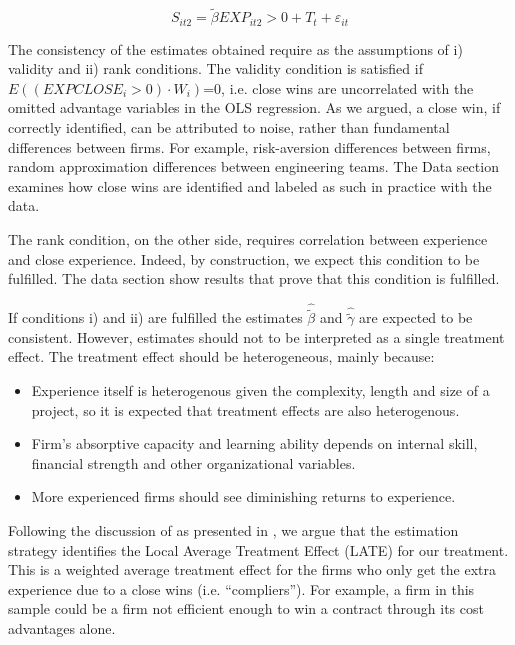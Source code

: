 \begin{equation}
\label{eqn:secondstage}
S_{it2}= \tilde{\beta} EXP_{it2}>0+T_t+\varepsilon_{it}
\end{equation}

The consistency of the estimates obtained require as the assumptions of i) validity and ii) rank conditions. The validity condition is satisfied if $E((EXPCLOSE_{i}>0)\cdot W_i)$=0, i.e. close wins are uncorrelated with the omitted advantage variables in the OLS regression. As we argued, a close win, if correctly identified, can be attributed to noise, rather than fundamental differences between firms. For example, risk-aversion differences between firms, random approximation differences between engineering teams. The Data section examines how close wins are identified and labeled as such in practice with the data.

The rank condition, on the other side, requires correlation between experience and close experience. Indeed, by construction, we expect this condition to be fulfilled.  The data section show results that prove that this condition is fulfilled.

If conditions i) and ii) are fulfilled the estimates $\hat{\tilde{\beta}}$ and $\hat{\tilde{\gamma}}$ are expected to be consistent. However, estimates should not to be interpreted as a single treatment effect. The treatment effect should be heterogeneous, mainly because:
\vspace{-5pt}
\begin{itemize}[itemsep=1pt]
  \item Experience itself is heterogenous given the complexity, length and size of a project, so it is expected that treatment effects are also heterogenous.
  \item Firm's absorptive capacity and learning ability depends on internal skill, financial strength and other organizational variables.
  \item More experienced firms should see diminishing returns to experience.
  \end{itemize}

Following the discussion of \parencite{angrist1995identification} as presented in \parencite{hansen2009econometrics}, we argue that the estimation strategy identifies the Local Average Treatment Effect (LATE) for our treatment. This is a weighted average treatment effect for the firms who only get the extra experience due to a close wins (i.e. “compliers”). For example, a firm in this sample could be a firm not efficient enough to win a contract through its cost advantages alone.

